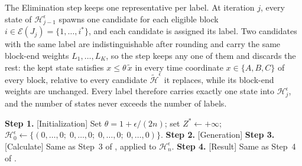 ﻿\documentclass[12pt]{article}
\begin{document}
\begin{sloppypar}
The Elimination step keeps one representative per label. At iteration $j$, every state of
$\mathscr{H}^{\epsilon}_{j-1}$ spawns one candidate for each eligible block
$i\in\mathcal{E}(J_j)=\{1,\dots,i^{*}\}$, and each candidate is assigned its label. Two
candidates with the same label are indistinguishable after rounding and carry the same
block-end weights $L_1,\dots,L_K$, so the step keeps any one of them and discards the rest:
the kept state satisfies $x\le\theta\,\tilde x$ in every time coordinate $x\in\{A,B,C\}$ of every
block, relative to every candidate $\tilde{\mathscr{H}}^{\epsilon}$ it replaces, while its
block-end weights are unchanged. Every
label therefore carries exactly one state into $\mathscr{H}^{\epsilon}_{j}$, and the number of
states never exceeds the number of labels.

\begin{algorithm}[H]
\small
\linespread{1.2}\selectfont
\SetAlgoLined
\DontPrintSemicolon
\caption{State-class FPTAS for $F2 \parallel WC_{\max}$}\label{alg:fptas}
\BlankLine
\textbf{Step 1.} [Initialization] Set $\theta=1+\epsilon/(2n)$; set $Z^{*}\gets+\infty$; 
			 $\mathscr{H}^{\epsilon}_{0}\gets\{(0,\dots,0; \; 0,\dots,0; \; 0,\dots,0; \; 0,\dots,0)\}$. \;
\textbf{Step 2.} [Generation] 
\textbf{Step 3.} [Calculate] Same as Step~3 of , applied to $\mathscr{H}^{\epsilon}_{n}$. \;
\textbf{Step 4.} [Result] Same as Step~4 of . \;
\end{algorithm}


\end{sloppypar}
\end{document}
